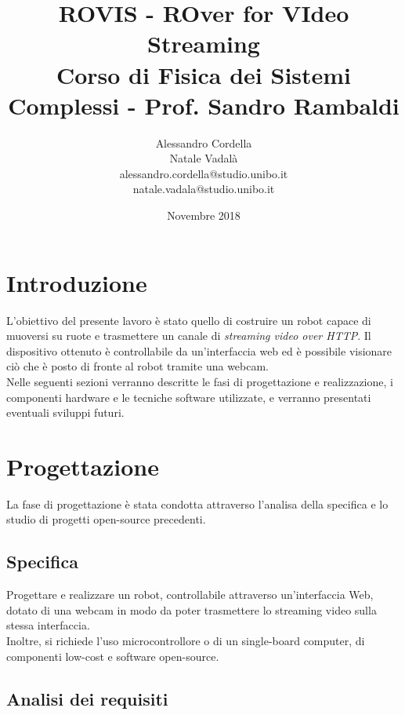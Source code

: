 \documentclass[11pt]{article}
\begin{document}
	\title{ROVIS - ROver for VIdeo Streaming\large\\Corso di Fisica dei Sistemi Complessi - Prof. Sandro Rambaldi}

	
	\author{Alessandro Cordella \\Natale Vadalà\\alessandro.cordella@studio.unibo.it\\natale.vadala@studio.unibo.it}\large
	\date{Novembre 2018}
	\maketitle
	\newpage
	\tableofcontents
	\newpage
\section{Introduzione}
L'obiettivo del presente lavoro è stato quello di costruire un robot capace di muoversi su ruote e trasmettere un canale di \textit{streaming video over HTTP}. Il dispositivo ottenuto è controllabile da un'interfaccia web ed è possibile visionare ciò che è posto di fronte al robot tramite una webcam.\\Nelle seguenti sezioni verranno descritte le fasi di progettazione e realizzazione, i componenti hardware e le tecniche software utilizzate, e verranno presentati eventuali sviluppi futuri.
\section{Progettazione}
La fase di progettazione è stata condotta attraverso l'analisa della specifica e lo studio di progetti open-source precedenti.
\subsection{Specifica}
Progettare e realizzare un robot, controllabile attraverso un'interfaccia Web, dotato di una webcam in modo da poter trasmettere lo streaming video sulla stessa interfaccia.\\
Inoltre, si richiede l'uso microcontrollore o di un single-board computer, di componenti low-cost e software open-source.
\subsection{Analisi dei requisiti}
\end{document}

